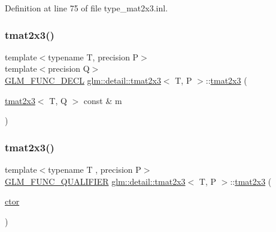 Definition at line 75 of file type\+\_\+mat2x3.\+inl.

\mbox{\label{structglm_1_1detail_1_1tmat2x3_a7fbd232bac090da9a982bd7071d0492b}} 
\subsubsection{\texorpdfstring{tmat2x3()}{tmat2x3()}\hspace{0.1cm}{\footnotesize\ttfamily [3/22]}}
{\footnotesize\ttfamily template$<$typename T, precision P$>$ \\
template$<$precision Q$>$ \\
\hyperlink{setup_8hpp_ab2d052de21a70539923e9bcbf6e83a51}{G\+L\+M\+\_\+\+F\+U\+N\+C\+\_\+\+D\+E\+CL} \hyperlink{structglm_1_1detail_1_1tmat2x3}{glm\+::detail\+::tmat2x3}$<$ T, P $>$\+::\hyperlink{structglm_1_1detail_1_1tmat2x3}{tmat2x3} (\begin{DoxyParamCaption}\item[{\hyperlink{structglm_1_1detail_1_1tmat2x3}{tmat2x3}$<$ T, Q $>$ const \&}]{m }\end{DoxyParamCaption})}

\mbox{\label{structglm_1_1detail_1_1tmat2x3_ab7acd9cede9ab295cdd2ce31d19f7549}} 
\subsubsection{\texorpdfstring{tmat2x3()}{tmat2x3()}\hspace{0.1cm}{\footnotesize\ttfamily [4/22]}}
{\footnotesize\ttfamily template$<$typename T , precision P$>$ \\
\hyperlink{setup_8hpp_a33fdea6f91c5f834105f7415e2a64407}{G\+L\+M\+\_\+\+F\+U\+N\+C\+\_\+\+Q\+U\+A\+L\+I\+F\+I\+ER} \hyperlink{structglm_1_1detail_1_1tmat2x3}{glm\+::detail\+::tmat2x3}$<$ T, P $>$\+::\hyperlink{structglm_1_1detail_1_1tmat2x3}{tmat2x3} (\begin{DoxyParamCaption}\item[{\hyperlink{structglm_1_1detail_1_1tmat2x3_ad7092896f5d4dad36473ed142687f571}{ctor}}]{ }\end{DoxyParamCaption})\hspace{0.3cm}{\ttfamily [explicit]}}



